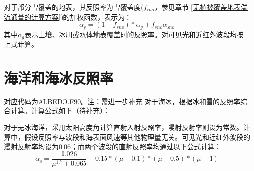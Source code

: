 对于部分雪覆盖的地表，其反照率为雪覆盖度($f_{sno}$，参见章节 \ref{无植被覆盖地表湍流通量的计算方案})的加权函数，表示为：
\begin{equation}
\alpha_{g}=\left(1-f_{sno}\right) * \alpha_{g}+f_{sno} \alpha_{sno}
\end{equation}
其中$\alpha_{g}$表示土壤、冰川或水体地表覆盖时的反照率。对可见光和近红外波段均按上式计算。

\section{海洋和海冰反照率}\label{海洋和海冰反照率}
对应代码为ALBEDO.F90。注：需进一步补充
对于海冰，根据冰和雪的反照率综合计算。计算公式如下（待补充）：

对于无冰海洋，采用太阳高度角计算直射入射反照率，漫射反射率则设为常数。计算中，假设反照率与波段和海表面风速等其他物理量无关。可见光和近红外波段的漫射反射率均设为0.06；而两个波段的直射反照率均通过以下公式计算：
\begin{equation}
\alpha_{s}= \frac{0.026}{\mu^{1.7}+0.065}+0.15*(\mu-0.1)*(\mu-0.5)*(\mu-1) 
\end{equation}

